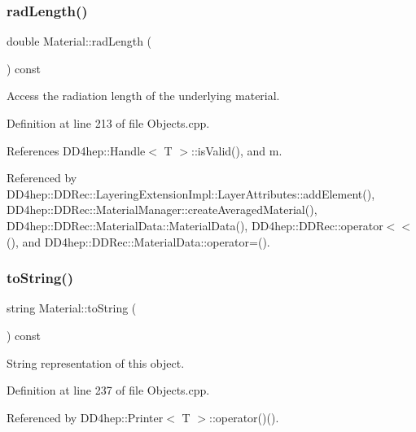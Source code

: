 \subsubsection{\texorpdfstring{rad\+Length()}{radLength()}}
{\footnotesize\ttfamily double Material\+::rad\+Length (\begin{DoxyParamCaption}{ }\end{DoxyParamCaption}) const}



Access the radiation length of the underlying material. 



Definition at line 213 of file Objects.\+cpp.



References D\+D4hep\+::\+Handle$<$ T $>$\+::is\+Valid(), and m.



Referenced by D\+D4hep\+::\+D\+D\+Rec\+::\+Layering\+Extension\+Impl\+::\+Layer\+Attributes\+::add\+Element(), D\+D4hep\+::\+D\+D\+Rec\+::\+Material\+Manager\+::create\+Averaged\+Material(), D\+D4hep\+::\+D\+D\+Rec\+::\+Material\+Data\+::\+Material\+Data(), D\+D4hep\+::\+D\+D\+Rec\+::operator$<$$<$(), and D\+D4hep\+::\+D\+D\+Rec\+::\+Material\+Data\+::operator=().

\hypertarget{class_d_d4hep_1_1_geometry_1_1_material_a87d90b949db042cbccaea167a640c643}{}\label{class_d_d4hep_1_1_geometry_1_1_material_a87d90b949db042cbccaea167a640c643} 
\subsubsection{\texorpdfstring{to\+String()}{toString()}}
{\footnotesize\ttfamily string Material\+::to\+String (\begin{DoxyParamCaption}{ }\end{DoxyParamCaption}) const}



String representation of this object. 



Definition at line 237 of file Objects.\+cpp.



Referenced by D\+D4hep\+::\+Printer$<$ T $>$\+::operator()().

\hypertarget{class_d_d4hep_1_1_geometry_1_1_material_a3a1338c2309602b72fd24b42956d3d94}{}\label{class_d_d4hep_1_1_geometry_1_1_material_a3a1338c2309602b72fd24b42956d3d94} 

